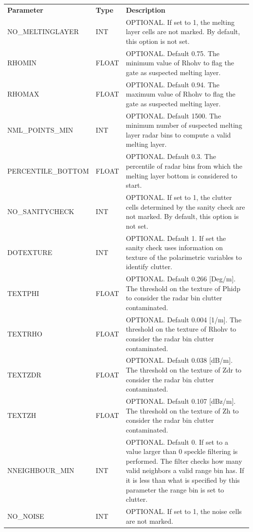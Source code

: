\documentclass[a4paper,11pt,pdftex,twoside]{scrartcl}
\renewcommand{\bf}{\normalfont \bfseries}
\begin{document}
{{{\begin{table}[H]
\begin{tabularx}{\textwidth}{llX}
\bf{Parameter}  & \bf{Type}  & \bf{Description}\\
NO\_MELTINGLAYER & INT & OPTIONAL. If set to 1, the melting layer cells are not marked.
                         By default, this option is not set.\\
RHOMIN & FLOAT & OPTIONAL. Default 0.75. The minimum value of Rhohv to flag the gate as suspected melting layer.\\
RHOMAX & FLOAT & OPTIONAL. Default 0.94. The maximum value of Rhohv to flag the gate as suspected melting layer.\\
NML\_POINTS\_MIN & INT & OPTIONAL. Default 1500. The minimum number of suspected melting layer radar bins to compute a valid melting layer.\\
PERCENTILE\_BOTTOM & FLOAT & OPTIONAL. Default 0.3. The percentile of radar bins from which the melting layer bottom is considered to start.\\
NO\_SANITYCHECK  & INT & OPTIONAL. If set to 1, the clutter cells determined by the sanity
                         check are not marked. By default, this option is not set.\\
DOTEXTURE & INT & OPTIONAL. Default 1. If set the sanity check uses information on texture of the polarimetric variables to identify clutter.\\
TEXTPHI & FLOAT & OPTIONAL. Default 0.266 [Deg/m]. The threshold on the texture of Phidp to consider the radar bin clutter contaminated.\\
TEXTRHO & FLOAT & OPTIONAL. Default 0.004 [1/m]. The threshold on the texture of Rhohv to consider the radar bin clutter contaminated.\\
TEXTZDR & FLOAT & OPTIONAL. Default 0.038 [dB/m]. The threshold on the texture of Zdr to consider the radar bin clutter contaminated.\\
TEXTZH & FLOAT & OPTIONAL. Default 0.107 [dBz/m]. The threshold on the texture of Zh to consider the radar bin clutter contaminated.\\
NNEIGHBOUR\_MIN & INT & OPTIONAL. Default 0. If set to a value larger than 0 speckle filtering is performed. The filter checks how many valid neighbors a valid range bin has. If it is less than what is specified by this parameter the range bin is set to clutter.\\
NO\_NOISE        & INT & OPTIONAL. If set to 1, the noise cells are not marked.

\end{tabularx}
\end{table}}}}
\end{document}
